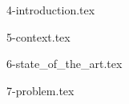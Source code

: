 \documentclass[oneside,11pt,a4paper,footinclude=true,headinclude=true,cleardoublepage=empty]{scrbook}
\author{Miguel António Ferrão Brito}
\date{\myear} %
\begin{document}
	\umfrontcover	
	\umtitlepage
	
	
	\tableofcontents
	\listoffigures
	\clearpage
	\thispagestyle{empty}

	

	{4-introduction.tex}
	
	{5-context.tex}
        
	{6-state_of_the_art.tex}

	{7-problem.tex}



		
\end{document}
